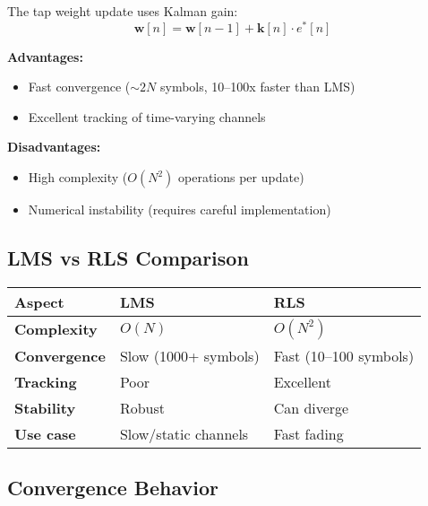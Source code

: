 The tap weight update uses Kalman gain:
\begin{equation}
\mathbf{w}[n] = \mathbf{w}[n-1] + \mathbf{k}[n] \cdot e^*[n]
\label{eq:rls-update}
\end{equation}

\textbf{Advantages:}
\begin{itemize}
\item Fast convergence ($\sim 2N$ symbols, 10--100x faster than LMS)
\item Excellent tracking of time-varying channels
\end{itemize}

\textbf{Disadvantages:}
\begin{itemize}
\item High complexity ($O(N^2)$ operations per update)
\item Numerical instability (requires careful implementation)
\end{itemize}

\subsection{LMS vs RLS Comparison}

\begin{center}
\begin{tabular}{@{}lll@{}}
\toprule
Aspect & LMS & RLS \\
\midrule
\textbf{Complexity} & $O(N)$ & $O(N^2)$ \\
\textbf{Convergence} & Slow (1000+ symbols) & Fast (10--100 symbols) \\
\textbf{Tracking} & Poor & Excellent \\
\textbf{Stability} & Robust & Can diverge \\
\textbf{Use case} & Slow/static channels & Fast fading \\
\bottomrule
\end{tabular}
\end{center}

\subsection{Convergence Behavior}

